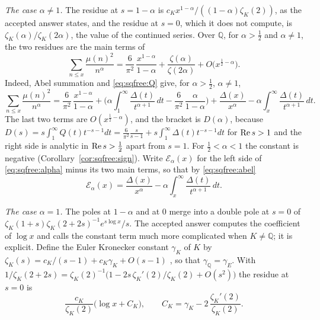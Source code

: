 \emph{The case $\alpha\ne1$.} The residue at $s=1-\alpha$ is $c_Kx^{1-\alpha}/((1-\alpha)\zeta_K(2))$, as the accepted answer states, and the residue at $s=0$, which it does not compute, is $\zeta_K(\alpha)/\zeta_K(2\alpha)$, the value of the continued series. Over $\mathbb Q$, for $\alpha>\frac12$ and $\alpha\ne1$, the two residues are the main terms of
\begin{equation}\label{eq:sqfree:alpha}
\sum_{n\le x}\frac{\mu(n)^2}{n^\alpha}=\frac6{\pi^2}\,\frac{x^{1-\alpha}}{1-\alpha}+\frac{\zeta(\alpha)}{\zeta(2\alpha)}+O\big(x^{\frac12-\alpha}\big).
\end{equation}
Indeed, Abel summation and \eqref{eq:sqfree:Q} give, for $\alpha>\frac12$, $\alpha\ne1$,
\begin{equation}\label{eq:sqfree:abel}
\sum_{n\le x}\frac{\mu(n)^2}{n^\alpha}=\frac6{\pi^2}\,\frac{x^{1-\alpha}}{1-\alpha}+\Big(\alpha\int_1^\infty\frac{\Delta(t)}{t^{\alpha+1}}\,dt-\frac6{\pi^2}\,\frac\alpha{1-\alpha}\Big)+\frac{\Delta(x)}{x^\alpha}-\alpha\int_x^\infty\frac{\Delta(t)}{t^{\alpha+1}}\,dt .
\end{equation}
The last two terms are $O(x^{\frac12-\alpha})$, and the bracket is $D(\alpha)$, because $D(s)=s\int_1^\infty Q(t)t^{-s-1}dt=\frac6{\pi^2}\frac s{s-1}+s\int_1^\infty\Delta(t)t^{-s-1}dt$ for $\operatorname{Re} s>1$ and the right side is analytic in $\operatorname{Re} s>\frac12$ apart from $s=1$. For $\frac12<\alpha<1$ the constant is negative (Corollary~\ref{cor:sqfree:sign}). Write $\mathcal E_\alpha(x)$ for the left side of \eqref{eq:sqfree:alpha} minus its two main terms, so that by \eqref{eq:sqfree:abel}
\begin{equation}\label{eq:sqfree:Ealpha}
\mathcal E_\alpha(x)=\frac{\Delta(x)}{x^\alpha}-\alpha\int_x^\infty\frac{\Delta(t)}{t^{\alpha+1}}\,dt .
\end{equation}

\emph{The case $\alpha=1$.} The poles at $1-\alpha$ and at $0$ merge into a double pole at $s=0$ of $\zeta_K(1+s)\zeta_K(2+2s)^{-1}e^{s\log x}/s$. The accepted answer computes the coefficient of $\log x$ and calls the constant term much more complicated when $K\ne\mathbb Q$; it is explicit. Define the Euler Kronecker constant $\gamma_K$ of $K$ by $\zeta_K(s)=c_K/(s-1)+c_K\gamma_K+O(s-1)$ \cite{Ihara06}, so that $\gamma_{\mathbb Q}=\gamma_E$. With $1/\zeta_K(2+2s)=\zeta_K(2)^{-1}\big(1-2s\,\zeta_K'(2)/\zeta_K(2)+O(s^2)\big)$ the residue at $s=0$ is
\begin{equation}\label{eq:sqfree:alpha1K}
\frac{c_K}{\zeta_K(2)}\big(\log x+C_K\big),\qquad C_K=\gamma_K-2\,\frac{\zeta_K'(2)}{\zeta_K(2)} .
\end{equation}

